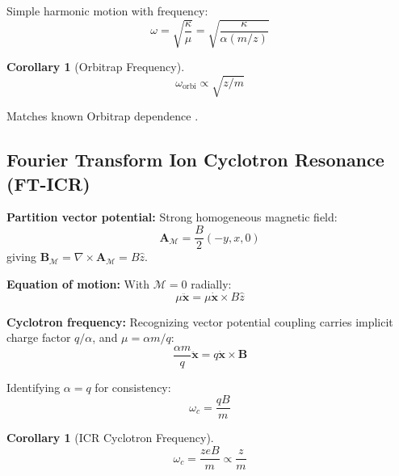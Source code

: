 \documentclass[twocolumn,10pt]{revtex4-2}
\newtheorem{corollary}[theorem]{Corollary}
\theoremstyle{definition}
\theoremstyle{remark}
\newcommand{\Mdepth}{\mathcal{M}}
\newcommand{\Apartition}{\mathbf{A}_{\Mdepth}}
\newcommand{\partinert}{\mu}
\begin{document}
Simple harmonic motion with frequency:
\begin{equation}
\omega = \sqrt{\frac{\kappa}{\partinert}} = \sqrt{\frac{\kappa}{\alpha(m/z)}}
\label{eq:orbitrap_freq}
\end{equation}

\begin{corollary}[Orbitrap Frequency]
\begin{equation}
\boxed{\omega_{\mathrm{orbi}} \propto \sqrt{z/m}}
\end{equation}
\end{corollary}

\noindent Matches known Orbitrap dependence \cite{Makarov2000}.

\subsection{Fourier Transform Ion Cyclotron Resonance (FT-ICR)}

\textbf{Partition vector potential:} Strong homogeneous magnetic field:
\begin{equation}
\Apartition = \frac{B}{2}(-y, x, 0)
\label{eq:icr_vector}
\end{equation}
giving $\mathbf{B}_{\Mdepth} = \nabla \times \Apartition = B\hat{z}$.

\textbf{Equation of motion:} With $\Mdepth = 0$ radially:
\begin{equation}
\partinert\ddot{\mathbf{x}} = \partinert\dot{\mathbf{x}} \times B\hat{z}
\label{eq:icr_eom}
\end{equation}

\textbf{Cyclotron frequency:} Recognizing vector potential coupling carries implicit charge factor $q/\alpha$, and $\partinert = \alpha m/q$:
\begin{equation}
\frac{\alpha m}{q}\ddot{\mathbf{x}} = q\dot{\mathbf{x}} \times \mathbf{B}
\end{equation}

Identifying $\alpha = q$ for consistency:
\begin{equation}
\omega_c = \frac{qB}{m}
\label{eq:cyclotron_freq}
\end{equation}

\begin{corollary}[ICR Cyclotron Frequency]
\begin{equation}
\boxed{\omega_c = \frac{zeB}{m} \propto \frac{z}{m}}
\end{equation}
\end{corollary}
\end{document}

